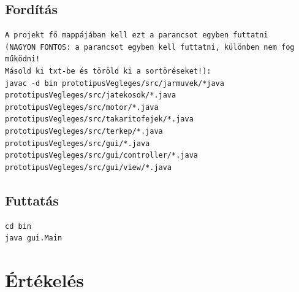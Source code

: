 \subsection{Fordítás}
\begin{verbatim}
A projekt fő mappájában kell ezt a parancsot egyben futtatni
(NAGYON FONTOS: a parancsot egyben kell futtatni, különben nem fog működni! 
Másold ki txt-be és töröld ki a sortöréseket!):
javac -d bin prototipusVegleges/src/jarmuvek/*java 
prototipusVegleges/src/jatekosok/*.java 
prototipusVegleges/src/motor/*.java 
prototipusVegleges/src/takaritofejek/*.java 
prototipusVegleges/src/terkep/*.java 
prototipusVegleges/src/gui/*.java 
prototipusVegleges/src/gui/controller/*.java 
prototipusVegleges/src/gui/view/*.java
\end{verbatim}

\subsection{Futtatás}
\begin{verbatim}
cd bin
java gui.Main
\end{verbatim}

\clearpage
\section{Értékelés}
\begin{ertekeles}
\end{ertekeles}

